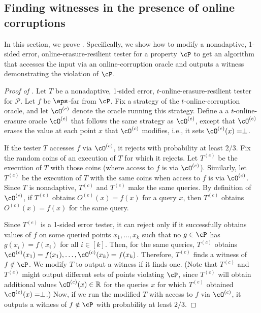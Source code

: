 \documentclass[11pt]{article}
\numberwithin{equation}{section}
\theoremstyle{definition}
\theoremstyle{plain}
\newcommand{\R}{\mathbb R}
\begin{document}
%
\subsection{Finding witnesses in the presence of online corruptions}\label{sec:detect}

In this section, we prove . Specifically, we show how to modify a nonadaptive, 1-sided error, online-erasure-resilient tester for a property $\cP$ to get an algorithm that accesses the input via an online-corruption oracle and outputs a witness demonstrating the violation of $\cP$. 


\begin{proof}[Proof of ]
    Let $T$ be a nonadaptive, 1-sided error, $t$-online-erasure-resilient tester for $\mathcal{P}$. Let $f$ be $\eps$-far from $\cP$. Fix a strategy of the $t$-online-corruption oracle, and let $\cO^{(c)}$ denote the oracle running this strategy. Define a a $t$-online-erasure oracle $\cO^{(e)}$ that follows the same strategy as  $\cO^{(e)}$, except that $\cO^{(e)}$ erases the value at each point $x$ that $\cO^{(c)}$ modifies,
%
i.e., it sets $\cO^{(e)}(x) = \perp$. 
    
    If the tester $T$ accesses $f$ via $\cO^{(e)}$, it rejects with probability at least $2/3$.
    Fix the random coins of an execution of $T$ for which it rejects. 
    Let $T^{(e)}$ be the execution of $T$ with those coins (where access to $f$ is via $\cO^{(e)}$). Similarly, let $T^{(c)}$ be the execution of $T$ with the same coins when access to $f$ is via $\cO^{(c)}$. 
    Since $T$ is nonadaptive, $T^{(c)}$ and $T^{(e)}$ make the same queries. By definition of $\cO^{(e)}$, if $T^{(e)}$ obtains $O^{(e)}(x) = f(x)$ for a query $x$, then $T^{(c)}$ obtains $O^{(c)}(x) = f(x)$ for the same query. 
  
    Since $T^{(e)}$ is a 1-sided error tester, it can reject only if it successfully obtains values of $f$ on some queried points $x_1, \dots, x_k$ such that no $g \in \cP$ has $g(x_i) =f(x_i)$ for all $i \in [k]$. Then, for the same queries,  $T^{(c)}$ obtains $\cO^{(c)}(x_1) = f(x_1), \dots, \cO^{(c)}(x_k)=f(x_k)$.  Therefore, $T^{(c)}$ finds a witness of $f \notin \cP$. We modify $T$ to output a witness if it finds one. (Note that $T^{(c)}$ and $T^{(e)}$ might output different sets of points violating $\cP$, since $T^{(c)}$ will obtain additional values $\cO^{(c)}(x) \in \R$ for the queries $x$ for which $T^{(e)}$ obtained $\cO^{(e)}(x) = \perp$.) Now, if we run the modified $T$ with access to $f$ via $\cO^{(c)}$, it outputs a witness of $f \notin \cP$ with probability at least $2/3$. 
\end{proof}
\end{document}
